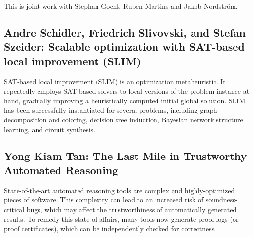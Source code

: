 \documentclass[11pt]{article}
\begin{document}
This is joint work with Stephan Gocht, Ruben Martins and Jakob Nordström.


\subsection*{Andre Schidler, Friedrich Slivovski, and Stefan Szeider: Scalable optimization with SAT-based local improvement (SLIM)}\label{Schidler}


SAT-based local improvement (SLIM) is an optimization metaheuristic. It repeatedly employs SAT-based solvers to local versions of the problem instance at hand, gradually improving a heuristically computed initial global solution. SLIM has been successfully instantiated for several problems, including graph decomposition and coloring, decision tree induction, Bayesian network structure learning, and circuit synthesis.








\subsection*{Yong Kiam Tan: The Last Mile in Trustworthy Automated Reasoning}\label{Tan}

State-of-the-art automated reasoning tools are complex and highly-optimized pieces of software. This complexity can lead to an increased risk of soundness-critical bugs, which may affect the trustworthiness of automatically generated results. To remedy this state of affairs, many tools now generate proof logs (or proof certificates), which can be independently checked for correctness.
\end{document}
